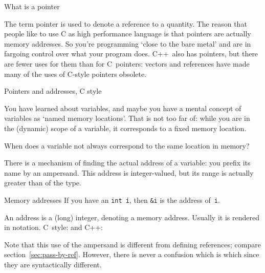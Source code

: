
 {What is a pointer}

The term pointer is used to denote a reference to a quantity. The
reason that people like to use C as high performance language is that
pointers are actually memory addresses. So you're programming `close
to the bare metal' and are in fargoing control over what your program
does. C++~also has pointers, but there are fewer uses for them than
for C~pointers: vectors and references have made many of the uses
of C-style pointers obsolete.

 {Pointers and addresses, C style}
\label{sec:cderef}

You have learned about variables, and maybe you have a mental concept
of variables as `named memory locations'. That is not too far of:
while you are in the (dynamic) scope of a variable, it corresponds to
a fixed memory location.

\begin{exercise}
  \label{ex:varmemscope}
  When does a variable not always correspond to the same location in
  memory?
\end{exercise}

There is a mechanism of finding the actual address of a variable: you
prefix its name by an ampersand. 
This address is integer-valued, but
its range is actually greater than of the  type.

\begin{block}{Memory addresses}
  \label{sl:ampersand}
  If you have an \lstinline{int i}, then \lstinline{&i} is the address of~\lstinline{i}.

An address is a (long) integer, denoting a memory address. Usually it
is rendered in  notation. C~style:
%
%
and C++:
%
\end{block}

Note that this use of the ampersand is different from defining
references; compare section~\ref{sec:pass-by-ref}. However, there is
never a confusion which is which since they are syntactically
different.

